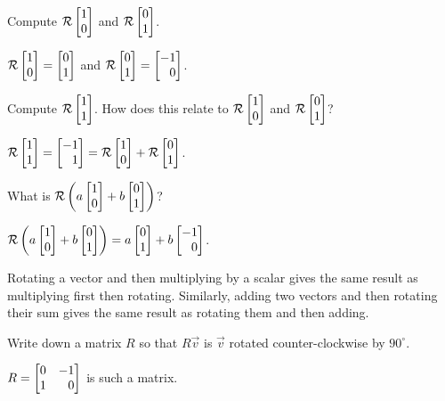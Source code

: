 	\begin{parts}
		\item Compute $\mathcal R\mat{1\\0}$ and $\mathcal R\mat{0\\1}$.
			\begin{solution}[inline]
				$\mathcal R\mat{1\\0}=\mat{0\\1}$ and
				$\mathcal R\mat{0\\1}=\mat{-1\\0}$.
			\end{solution}
		\item Compute $\mathcal R\mat{1\\1}$. How does this relate to
			$\mathcal R\mat{1\\0}$ and $\mathcal R\mat{0\\1}$?
			\begin{solution}
				$\mathcal R\mat{1\\1}=\mat{-1\\1}=\mathcal R\mat{1\\0}+\mathcal R\mat{0\\1}$.
			\end{solution}
		\item What is $\mathcal R\left(a\mat{1\\0}+b\mat{0\\1}\right)$?
			\begin{solution}
				$\mathcal R\left(a\mat{1\\0}+b\mat{0\\1}\right)=a\mat{0\\1}+b\mat{-1\\0}$.

				Rotating a vector and then multiplying by a scalar gives the same
				result as multiplying first then rotating. Similarly, adding two
				vectors and then rotating their sum gives the same result as rotating
				them and then adding.
			\end{solution}
		\item Write down a matrix $R$ so that $R\vec v$ is $\vec v$ rotated
			counter-clockwise by $90^\circ$.
			\begin{solution}
				$R = \mat{0&-1\\1&0}$ is such a matrix.
			\end{solution}
	\end{parts}

	\bookonlynewpage

